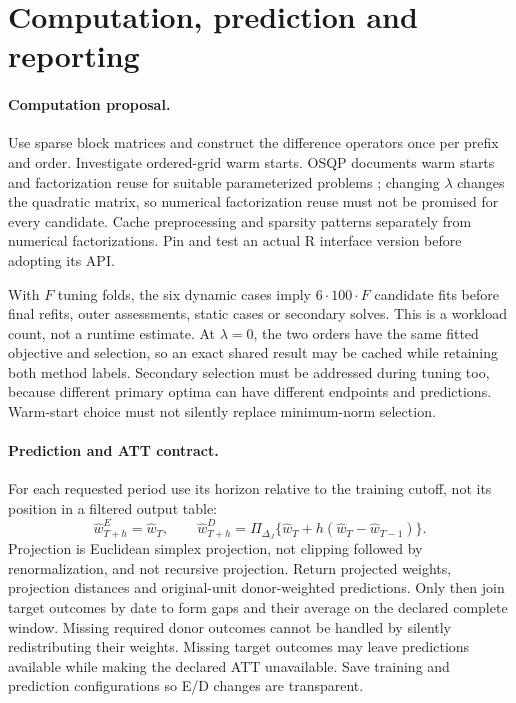 \documentclass[11pt]{article}
\begin{document}
\section{Computation, prediction and reporting}
\paragraph{Computation proposal.}
Use sparse block matrices and construct the difference operators once per
prefix and order. Investigate ordered-grid warm starts. OSQP documents
warm starts and factorization reuse for suitable parameterized problems
\cite{osqp}; changing $\lambda$ changes the quadratic matrix, so numerical
factorization reuse must not be promised for every candidate. Cache
preprocessing and sparsity patterns separately from numerical factorizations.
Pin and test an actual R interface version before adopting its API.

With $F$ tuning folds, the six dynamic cases imply $6\cdot100\cdot F$
candidate fits before final refits, outer assessments, static cases or
secondary solves. This is a workload count, not a runtime estimate.
At $\lambda=0$, the two orders have the same fitted objective and selection,
so an exact shared result may be cached while retaining both method labels.
Secondary selection must be addressed during tuning too, because different
primary optima can have different endpoints and predictions. Warm-start
choice must not silently replace minimum-norm selection.

\paragraph{Prediction and ATT contract.}
For each requested period use its horizon relative to the training cutoff,
not its position in a filtered output table:
\[
 \widehat w^E_{T+h}=\widehat w_T,\qquad
 \widehat w^D_{T+h}=\Pi_{\Delta_J}
   \{\widehat w_T+h(\widehat w_T-\widehat w_{T-1})\}.
\]
Projection is Euclidean simplex projection, not clipping followed by
renormalization, and not recursive projection. Return projected weights,
projection distances and original-unit donor-weighted predictions.
Only then join target outcomes by date to form gaps and their average on
the declared complete window. Missing required donor outcomes cannot be
handled by silently redistributing their weights. Missing target outcomes
may leave predictions available while making the declared ATT unavailable.
Save training and prediction configurations so E/D changes are transparent.
\end{document}
